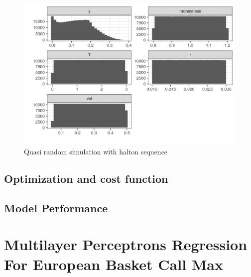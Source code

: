 \begin{figure}[th]
\centering
\includegraphics{Figures/marginalAmerPut.png}
\decoRule
\caption[Marginal distributions for american put]{Quasi random simulation with halton sequence}
\label{fig:marginalEuro}
\end{figure}

\subsection{Optimization and cost function}

\subsection{Model Performance}


\section{Multilayer Perceptrons Regression For European Basket Call Max}

\parencite{FergusonRyan2018}